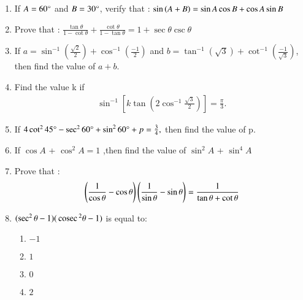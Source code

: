 \begin{enumerate}[label=\thesubsection.\arabic*.,ref=\thesubsection.\theenumi]
\hfill{}\item If  $A = 60\degree$ and  $B = 30\degree$, verify that : $\sin\left(A + B\right) = \sin A \cos B + \cos A \sin B$

\hfill{}\item Prove that : $\frac{\tan{\theta}}{1 - \cot{\theta}} + \frac{\cot{\theta}}{1 - \tan{\theta}} = 1 + \sec
{\theta}\csc{\theta}$
\hfill{}

\item If $ a = \sin^{-1}\left(\frac{\sqrt{2}}{2}\right) + \cos^{-1}\left(\frac{-1}{2}\right) $ and $ b = \tan^{-1}(\sqrt{3}) + \cot^{-1}\left(\frac{-1}{\sqrt{3}}\right) $, then find the value of $a + b$.





\hfill{}\item Find the value k if 
\\ 
	\begin {align}
	\sin^{-1} \left[k \tan \left( 2\cos^{-1} \frac {\sqrt{3}}{2}\right)\right]= \frac{\pi}{3}.
\end {align}
\hfill{}

\item If $4 \cot^{2}45\degree-\sec^{2}60\degree+\sin^{2}60\degree+p=\frac{3}{4},$ then find the value of p.

\hfill{}\item If $\cos A$ + $\cos^{2}A = 1$ ,then find the value of $\sin^{2}A$ + $\sin^{4}A$
\hfill{}

\item Prove that :
\begin{align}
	\left(\frac{1}{\cos\theta}-\cos\theta\right) \left(\frac{1}{\sin\theta}-\sin\theta\right) = \frac{1}{\tan\theta + \cot\theta}
\end{align}
\hfill{}

\item $ (\sec^2 \theta - 1)(\,\text{cosec}\,^2 \theta - 1)$
is equal to:
\begin{enumerate}
\item $-1$
\item $1$
\item $0$
\item $2$
\end{enumerate}


\end{enumerate}
